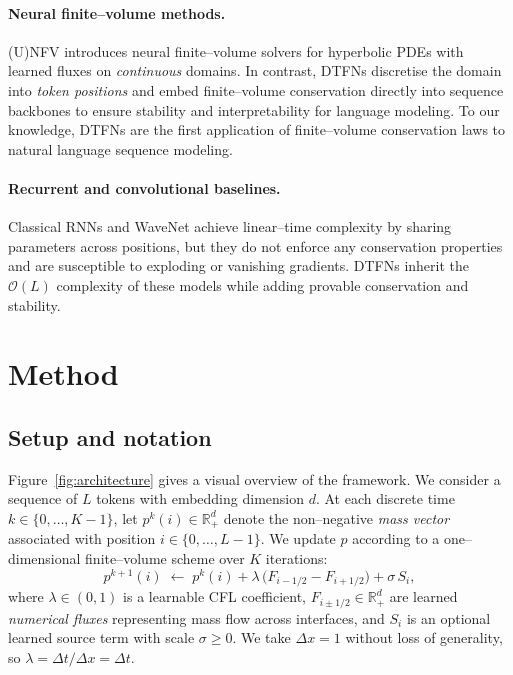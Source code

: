\documentclass[10pt]{article}
\theoremstyle{definition}
\theoremstyle{remark}
\newcommand{\Rplus}{\mathbb{R}_+}
\begin{document}
\paragraph{Neural finite--volume methods.}
(U)NFV \cite{lichtle2023unfv} introduces neural finite--volume solvers
for hyperbolic PDEs with learned fluxes on \emph{continuous} domains.
In contrast, DTFNs discretise the domain into \emph{token positions}
and embed finite--volume conservation directly into sequence backbones
to ensure stability and interpretability for language modeling.  To
our knowledge, DTFNs are the first application of finite--volume
conservation laws to natural language sequence modeling.

\paragraph{Recurrent and convolutional baselines.}
Classical RNNs and WaveNet \cite{oord2016wavenet} achieve linear--time
complexity by sharing parameters across positions, but they do not
enforce any conservation properties and are susceptible to exploding
or vanishing gradients.  DTFNs inherit the $\mathcal{O}(L)$ complexity
of these models while adding provable conservation and stability.

\section{Method}
\label{sec:method}

\subsection{Setup and notation}

Figure~\ref{fig:architecture} gives a visual overview of the
framework.  We consider a sequence of $L$ tokens with embedding dimension $d$.
At each discrete time $k\in\{0,\dots,K-1\}$, let
$p^k(i)\in\Rplus^d$ denote the non--negative \emph{mass vector}
associated with position $i\in\{0,\dots,L-1\}$.  We update $p$ according
to a one--dimensional finite--volume scheme over $K$ iterations:
\begin{equation}
  p^{k+1}(i) \;\leftarrow\; p^k(i) + \lambda\,\bigl(F_{i-1/2} - F_{i+1/2}\bigr) + \sigma\, S_i,
  \label{eq:update}
\end{equation}
where $\lambda\in(0,1)$ is a learnable CFL coefficient, $F_{i\pm1/2}\in\Rplus^d$
are learned \emph{numerical fluxes} representing mass flow across
interfaces, and $S_i$ is an optional learned source term with scale
$\sigma\ge 0$.  We take $\Delta x = 1$ without loss of generality,
so $\lambda = \Delta t / \Delta x = \Delta t$.
\end{document}
